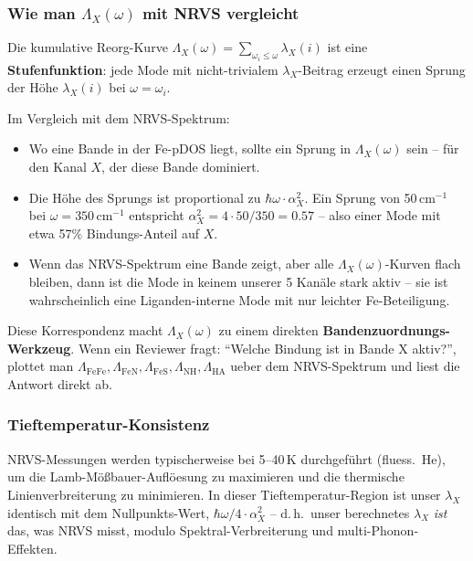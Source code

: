 \documentclass[11pt,a4paper,twoside]{article}
\theoremstyle{remark}
\begin{document}
\subsubsection*{Wie man $\Lambda_X(\omega)$ mit NRVS vergleicht}

Die kumulative Reorg-Kurve $\Lambda_X(\omega) = \sum_{\omega_i \leq
\omega} \lambda_X(i)$ ist eine \textbf{Stufenfunktion}: jede Mode mit
nicht-trivialem $\lambda_X$-Beitrag erzeugt einen Sprung der H\"ohe
$\lambda_X(i)$ bei $\omega = \omega_i$.

Im Vergleich mit dem NRVS-Spektrum:
\begin{itemize}\setlength{\itemsep}{0pt}
  \item Wo eine Bande in der Fe-pDOS liegt, sollte ein Sprung in
        $\Lambda_X(\omega)$ sein -- f\"ur den Kanal $X$, der diese
        Bande dominiert.
  \item Die H\"ohe des Sprungs ist proportional zu $\hbar\omega \cdot
        \alpha_X^2$. Ein Sprung von 50\,cm$^{-1}$ bei
        $\omega = 350$\,cm$^{-1}$ entspricht $\alpha_X^2 = 4 \cdot 50/350
        = 0.57$ -- also einer Mode mit etwa 57\% Bindungs-Anteil
        auf $X$.
  \item Wenn das NRVS-Spektrum eine Bande zeigt, aber alle
        $\Lambda_X(\omega)$-Kurven flach bleiben, dann ist die Mode
        in keinem unserer 5 Kan\"ale stark aktiv -- sie ist
        wahrscheinlich eine Liganden-interne Mode mit nur leichter
        Fe-Beteiligung.
\end{itemize}

Diese Korrespondenz macht $\Lambda_X(\omega)$ zu einem direkten
\textbf{Bandenzuordnungs-Werkzeug}. Wenn ein Reviewer fragt:
"`Welche Bindung ist in Bande X aktiv?"', plottet man
$\Lambda_\text{FeFe}, \Lambda_\text{FeN}, \Lambda_\text{FeS},
\Lambda_\text{NH}, \Lambda_\text{HA}$ ueber dem NRVS-Spektrum und
liest die Antwort direkt ab.

\subsubsection*{Tieftemperatur-Konsistenz}

NRVS-Messungen werden typischerweise bei 5--40\,K durchgef\"uhrt
(fluess.\ He), um die Lamb-M\"o{\ss}bauer-Auflöesung zu maximieren und
die thermische Linienverbreiterung zu minimieren. In dieser
Tieftemperatur-Region ist unser $\lambda_X$ identisch mit dem
Nullpunkts-Wert, $\hbar\omega/4 \cdot \alpha_X^2$ -- d.\,h.\ unser
berechnetes $\lambda_X$ \emph{ist} das, was NRVS misst, modulo
Spektral-Verbreiterung und multi-Phonon-Effekten.
\end{document}
